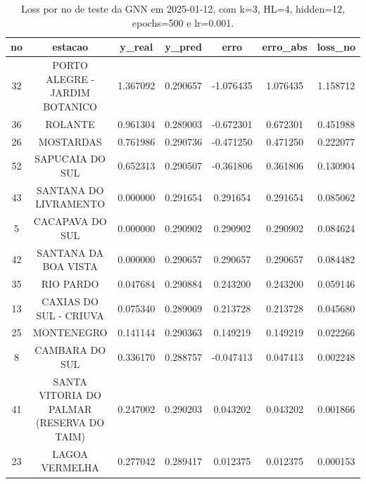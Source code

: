 \begin{table}[h]
\centering
\caption{Loss por no de teste da GNN em 2025-01-12, com k=3, HL=4, hidden=12, epochs=500 e lr=0.001.}
\label{tab:gnn_loss_k3_hl4_h12_e500_d20250112}
\begin{tabular}{ccccccc}
\toprule
no & estacao & y\_real & y\_pred & erro & erro\_abs & loss\_no \\
\midrule
32 & PORTO ALEGRE - JARDIM BOTANICO & 1.367092 & 0.290657 & -1.076435 & 1.076435 & 1.158712 \\
36 & ROLANTE & 0.961304 & 0.289003 & -0.672301 & 0.672301 & 0.451988 \\
26 & MOSTARDAS & 0.761986 & 0.290736 & -0.471250 & 0.471250 & 0.222077 \\
52 & SAPUCAIA DO SUL & 0.652313 & 0.290507 & -0.361806 & 0.361806 & 0.130904 \\
43 & SANTANA DO LIVRAMENTO & 0.000000 & 0.291654 & 0.291654 & 0.291654 & 0.085062 \\
5 & CACAPAVA DO SUL & 0.000000 & 0.290902 & 0.290902 & 0.290902 & 0.084624 \\
42 & SANTANA DA BOA VISTA & 0.000000 & 0.290657 & 0.290657 & 0.290657 & 0.084482 \\
35 & RIO PARDO & 0.047684 & 0.290884 & 0.243200 & 0.243200 & 0.059146 \\
13 & CAXIAS DO SUL - CRIUVA & 0.075340 & 0.289069 & 0.213728 & 0.213728 & 0.045680 \\
25 & MONTENEGRO & 0.141144 & 0.290363 & 0.149219 & 0.149219 & 0.022266 \\
8 & CAMBARA DO SUL & 0.336170 & 0.288757 & -0.047413 & 0.047413 & 0.002248 \\
41 & SANTA VITORIA DO PALMAR (RESERVA DO TAIM) & 0.247002 & 0.290203 & 0.043202 & 0.043202 & 0.001866 \\
23 & LAGOA VERMELHA & 0.277042 & 0.289417 & 0.012375 & 0.012375 & 0.000153 \\
\bottomrule
\end{tabular}
\end{table}
